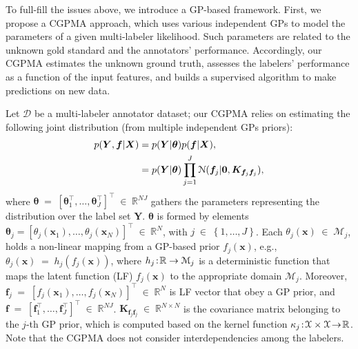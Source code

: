 \documentclass[journal]{IEEEtran}
\providecommand{\ve}[1]{{\bm{#1}}}%
\providecommand{\mat}[1]{{\bm{#1}}} %
\newcommand{\Real}{\mathbb{R}}
\DeclareMathOperator{\en}{\!\,\in\!\,}
\DeclareMathOperator{\igual}{\!\,=\!\,}
\providecommand{\s}[1]{\negthinspace#1\negthinspace}%
\providecommand{\ve}[1]{{\mathbf{#1}}}
\providecommand{\mat}[1]{{\mathbf{#1}}}
\newcommand{\gauss}{\mathcal{N}} %
\begin{document}
To full-fill the issues above, we introduce a GP-based framework. First, we propose a CGPMA approach, which uses various independent GPs to model the parameters of a given multi-labeler likelihood. Such parameters are related to the unknown gold standard and the annotators' performance. Accordingly, our CGPMA estimates the unknown ground truth, assesses the labelers' performance as a function of the input features, and builds a supervised algorithm to make predictions on new data. 

Let $\mathcal{D}$ be a multi-labeler annotator dataset; our CGPMA relies on estimating the following joint distribution (from multiple independent GPs priors):
\begin{align}
\notag p(\mat{Y},{\ve{f}}|\mat{X}) &= p(\mat{Y}|{\bm{\theta}})p({\ve{f}}|\mat{X}),\\
&= p(\mat{Y}|{\bm{\theta}})\prod_{j=1}^{J}\gauss(\ve{f}_j|\ve{0}, \mat{K}_{\ve{f}_j\ve{f}_j}),
\label{eq:Likelihood}
\end{align}
where ${\bm{\theta}} \igual \left[\bm{\theta}_1^{\top}, \dots , \bm{\theta}_J^{\top}\right]^{\top}\en \Real^{NJ}$ gathers the parameters representing the distribution over the label set $\mat{Y}$. ${\bm{\theta}}$ is formed by elements $\bm{\theta}_j = \left[\theta_j(\ve{x}_1), \dots , \theta_j(\ve{x}_N)\right]^{\top}\en \Real^{N}$, with $j\en \left\{1,\dots ,J \right\}$. Each $\theta_j(\ve{x}) \en \mathcal{M}_j$, holds a non-linear mapping from a GP-based prior $f_j (\ve{x})$, e.g., $\theta_j(\ve{x})\igual h_j(f_j(\ve{x}))$,
where $h_j\s{:}\Real\to \mathcal{M}_j$ is a deterministic function that maps the latent function (LF) $f_j(\ve{x})$ to the appropriate domain $\mathcal{M}_j$. Moreover, $\ve{f}_j\igual\left[f_j(\ve{x}_1), \dots , f_j(\ve{x}_N)\right]^{\top}\en \Real^{N}$ is LF vector that obey a GP prior, and ${\ve{f}} \igual \left[\ve{f}_1^{\top}, \dots , \ve{f}_J^{\top}\right]^{\top}\en \Real^{NJ}$. $\mat{K}_{\ve{f}_j\ve{f}_j} \en\Real^{N\times N}$ is the covariance matrix belonging to the $j$-th GP prior, which is computed based on the kernel function  $\kappa_j\s{:}\mathcal{X}\times\mathcal{X}\s{\to}\Real$. Note that the CGPMA does not consider interdependencies among the labelers. 
\end{document}
